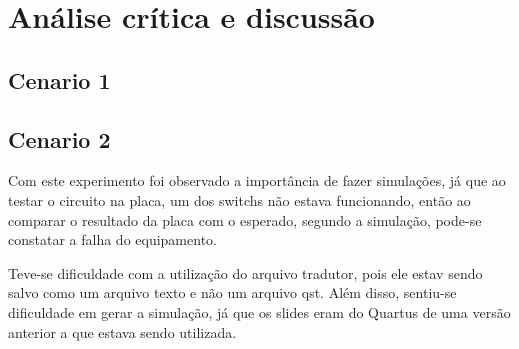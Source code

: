 \chapter{Análise crítica e discussão}
\section{Cenario 1}

\section{Cenario 2}
	Com este experimento foi observado a importância de fazer simulações, já que ao testar o circuito na placa,
	um dos switchs não estava funcionando, então ao comparar o resultado da placa com o esperado,
	 segundo a simulação, pode-se constatar a falha do equipamento.

	 Teve-se dificuldade com a utilização do arquivo tradutor, pois ele estav sendo salvo como um arquivo texto
	 e não um arquivo qst. Além disso, sentiu-se dificuldade em gerar a simulação, já que os slides eram do Quartus
	 de uma versão anterior a que estava sendo utilizada.

